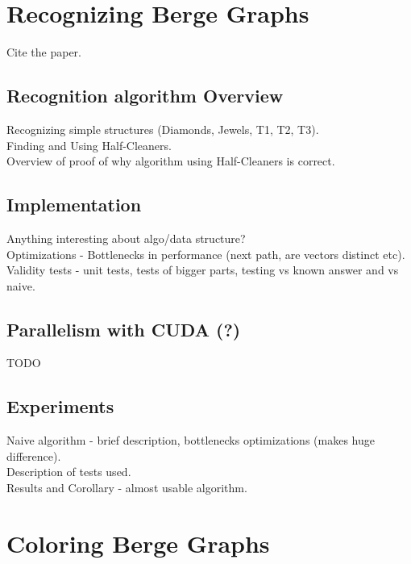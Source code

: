 \documentclass{article}
\begin{document}
\section{Recognizing Berge Graphs}
Cite the paper.

\subsection{Recognition algorithm Overview}
Recognizing simple structures (Diamonds, Jewels, T1, T2, T3).\\

Finding and Using Half-Cleaners.\\

Overview of proof of why algorithm using Half-Cleaners is correct.\\

\subsection{Implementation}

Anything interesting about algo/data structure?\\

Optimizations - Bottlenecks in performance (next path, are vectors distinct etc).\\

Validity tests - unit tests, tests of bigger parts, testing vs known answer and vs naive.

\subsection{Parallelism with CUDA (?)}

TODO

\subsection{Experiments}

Naive algorithm - brief description, bottlenecks optimizations (makes huge difference).\\

Description of tests used.\\

Results and Corollary - almost usable algorithm.



\section{Coloring Berge Graphs}
\end{document}
